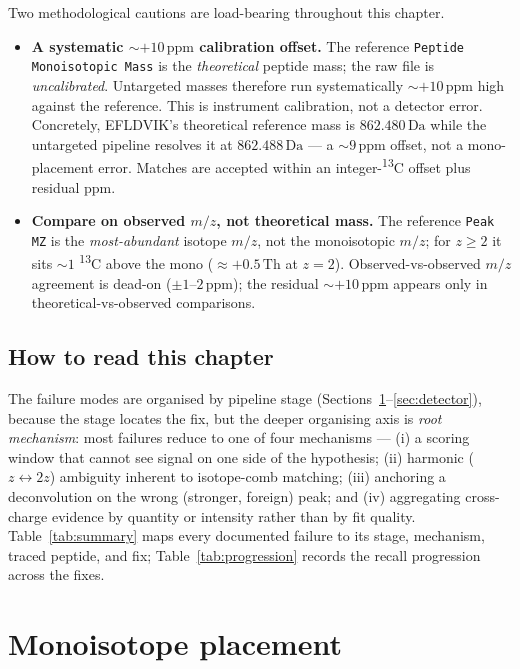 \documentclass[11pt]{article}
\newcommand{\ppm}{\,\text{ppm}}
\newcommand{\Da}{\,\text{Da}}
\newcommand{\Th}{\,\text{Th}}
\newcommand{\Cthirteen}{\textsuperscript{13}C}
\newcommand{\mz}{\ensuremath{m/z}}
\newcommand{\zeq}[1]{\ensuremath{z{=}#1}}
\begin{document}
Two methodological cautions are load-bearing throughout this chapter.

\begin{itemize}[leftmargin=1.4em]
  \item \textbf{A systematic \boldmath$\sim+10\ppm$ calibration offset.} The reference
  \texttt{Peptide Monoisotopic Mass} is the \emph{theoretical} peptide mass; the raw file is
  \emph{uncalibrated}. Untargeted masses therefore run systematically $\sim +10\ppm$ high
  against the reference. This is instrument calibration, not a detector error. Concretely,
  EFLDVIK's theoretical reference mass is $862.480\Da$ while the untargeted pipeline resolves
  it at $862.488\Da$ --- a $\sim 9\ppm$ offset, not a mono-placement error. Matches are
  accepted within an integer-\Cthirteen{} offset plus residual ppm.
  \item \textbf{Compare on observed \mz, not theoretical mass.} The reference \texttt{Peak MZ}
  is the \emph{most-abundant} isotope \mz, not the monoisotopic \mz; for $z \geq 2$ it sits
  $\sim 1$ \Cthirteen{} above the mono ($\approx +0.5\Th$ at \zeq{2}). Observed-vs-observed \mz
  agreement is dead-on ($\pm 1$--$2\ppm$); the residual $\sim +10\ppm$ appears only in
  theoretical-vs-observed comparisons.
\end{itemize}

\subsection{How to read this chapter}
The failure modes are organised by pipeline stage (Sections~\ref{sec:mono}--\ref{sec:detector}),
because the stage locates the fix, but the deeper organising axis is \emph{root mechanism}: most
failures reduce to one of four mechanisms --- (i) a scoring window that cannot see signal on one
side of the hypothesis; (ii) harmonic ($z \leftrightarrow 2z$) ambiguity inherent to isotope-comb
matching; (iii) anchoring a deconvolution on the wrong (stronger, foreign) peak; and (iv)
aggregating cross-charge evidence by quantity or intensity rather than by fit quality.
Table~\ref{tab:summary} maps every documented failure to its stage, mechanism, traced peptide,
and fix; Table~\ref{tab:progression} records the recall progression across the fixes.

\section{Monoisotope placement}
\label{sec:mono}
\end{document}
